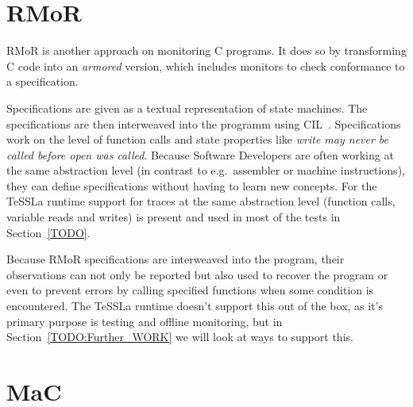 
\section{RMoR}
\label{sec:related:rmor}

RMoR is another approach on monitoring C programs.
It does so by transforming C code into an \emph{armored} version, which includes monitors to check conformance to a specification.

Specifications are given as a textual representation of state machines.
The specifications are then interweaved into the programm using CIL~\cite{Necula2002}.
Specifications work on the level of function calls and state properties like \emph{write may never be called before open was called}.
Because Software Developers are often working at the same abstraction level (in contrast to e.g.\ assembler or machine instructions), they can define specifications without having to learn new concepts.
For the TeSSLa runtime support for traces at the same abstraction level (function calls, variable reads and writes) is present and used in most of the tests in Section~\ref{TODO}.

Because RMoR specifications are interweaved into the program, their observations can not only be reported but also used to recover the program or even to prevent errors by calling specified functions when some condition is encountered.
The TeSSLa runtime doesn't support this out of the box, as it's primary purpose is testing and offline monitoring, but in Section~\ref{TODO:Further_WORK} we will look at ways to support this.

\section{MaC}
